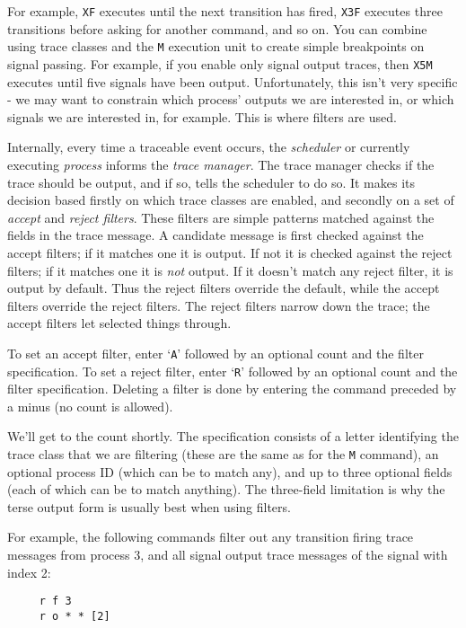 For example, {\tt XF} executes until the next transition has fired,
{\tt X3F} executes three transitions before asking for another
command, and so on. You can combine using trace classes and the
{\tt M} execution unit to create simple breakpoints on signal
passing. For example, if you enable only signal output traces, then 
{\tt X5M} executes until five signals have been output.
Unfortunately, this isn't very specific - we may want to constrain
which process' outputs we are interested in, or which signals we are
interested in, for example. This is where filters are used.

Internally, every time a traceable event occurs, the {\em scheduler}
or currently executing {\em process} informs the {\em trace manager}.
The trace manager checks if the trace should be output, and if so,
tells the scheduler to do so. It makes its decision based firstly on
which trace classes are enabled, and secondly on a set of {\em
accept} and {\em reject filters}. These filters are simple patterns
matched against the fields in the trace message. A candidate message
is first checked against the accept filters; if it matches one it is 
output. If not it is checked against the reject filters; if it
matches one it is {\em not} output. If it doesn't match any reject
filter, it is output by default. Thus the reject filters override the
default, while the accept filters override the reject filters. The
reject filters narrow down the trace; the accept filters let selected
things through.

To set an accept filter, enter `{\tt A}' followed by an optional
count and the filter specification. 
To set a reject filter, enter `{\tt R}' followed by an optional
count and the filter specification. Deleting a filter is done 
by entering the command preceded by a minus (no count is allowed).

We'll get to the count shortly. The specification consists of a
letter identifying the trace class that we are filtering (these are
the same as for the {\tt M} command), an optional process ID (which
can be {\tt *} to match any), and up to three optional fields (each
of which can be {\tt *} to match anything). The three-field
limitation is why the terse output form is usually best when using
filters.

For example, the following commands filter out any transition firing
trace messages from process 3, and all signal output trace messages
of the signal with index 2:

\begin{verbatim}
     r f 3
     r o * * [2]
\end{verbatim}

